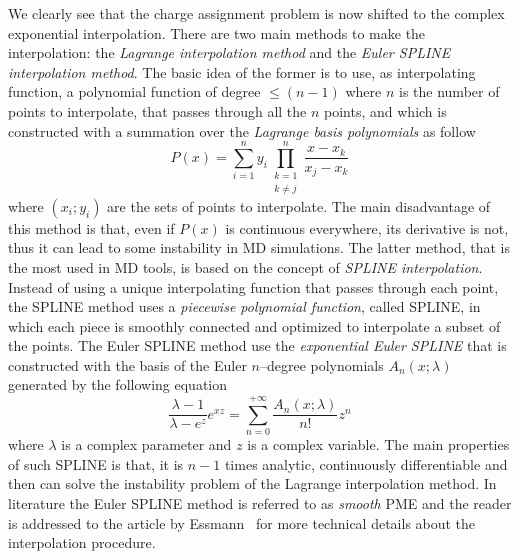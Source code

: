 We clearly see that the charge assignment problem is now shifted to the complex exponential interpolation. There are two main methods to make the interpolation: the \textit{Lagrange interpolation method} and the \textit{Euler SPLINE interpolation method}. The basic idea of the former is to use, as interpolating function, a polynomial function of degree $ \le (n-1)$ where $n$ is the number of points to interpolate, that passes through all the $n$ points, and which is constructed with a summation over the \textit{Lagrange basis polynomials} as follow
\begin{equation*}
	P(x) = \sum_{i=1}^n y_i \prod_{\substack{k=1\\k\ne j}}^n \frac{x-x_k}{x_j - x_k}
\end{equation*}
where $(x_i;y_i)$ are the sets of points to interpolate. The main disadvantage of this method is that, even if $P(x)$ is continuous everywhere, its derivative is not, thus it can lead to some instability in \ac{MD} simulations. The latter method, that is the most used in \ac{MD} tools, is based on the concept of \textit{SPLINE interpolation}. Instead of using a unique interpolating function that passes through each point, the SPLINE method uses a \textit{piecewise polynomial function}, called SPLINE, in which each piece is smoothly connected and optimized to interpolate a subset of the points. The Euler SPLINE method use the \textit{exponential Euler SPLINE} that is constructed with the basis of the Euler $n$--degree polynomials $A_n(x;\lambda)$ generated by the following equation
\begin{equation*}
	\frac{\lambda - 1}{\lambda - e^z}e^{xz} = \sum_{n=0}^{+\infty} \frac{A_n(x;\lambda)}{n!}z^n
\end{equation*}
where $\lambda$ is a complex parameter and $z$ is a complex variable. The main properties of such SPLINE is that, it is $n-1$ times analytic, continuously differentiable and then can solve the instability problem of the Lagrange interpolation method. In literature the Euler SPLINE method is referred to as \textit{smooth} \acl{PME} and the reader is addressed to the article by Essmann \etal\, \cite{EssmannSPME} for more technical details about the interpolation procedure.

